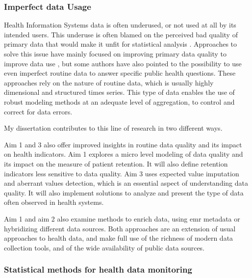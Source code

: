 \subsubsection{Imperfect data Usage}


Health Information Systems data is often underused, or not used at all by its intended users\citep{health_metrics_network_framework_2008}. This underuse is often blamed on the  perceived bad quality of primary data that would make it unfit for statistical analysis
\citep{ronveaux_immunization_2005,makombe_assessing_2008,heunis_accuracy_2011,gimbel_assessment_2011,who_assessment_2011,hahn_where_2013,kihuba_assessing_2014,glele_ahanhanzo_data_2015}. Approaches to solve this issue have mainly focused on improving primary data quality to improve data use  \citep{braa_improving_2012,mutale_improving_2013,ledikwe_improving_2014,nisingizwe_toward_2014}, but some authors have also pointed to the possibility to use even imperfect routine data to answer specific public health questions\citep{gething_improving_2006,gething_information_2007,wagenaar_using_2016}. These approaches rely on the nature of routine data, which is usually highly dimensional and structured times series. This type of data enables the use of robust modeling methods at an adequate level of aggregation, to control and correct for data errors.

My dissertation contributes to this line of research in two different ways.

Aim 1 and 3 also offer improved insights in routine data quality and its impact on health indicators. Aim 1  explores a micro level modeling of data quality and its impact on the measure of patient retention. It will also define retention indicators less sensitive to data quality. Aim 3 uses expected value imputation and aberrant values detection, which is an essential aspect of understanding data quality. It will also implement solutions  to analyze and present the type of data often observed in health systems.

Aim 1 and aim 2 also examine methods to enrich data, using \gls{emr} metadata or  hybridizing different data sources. Both approaches are an extension of usual approaches to health data, and make full use of the richness of modern data collection tools, and of the wide availability of public data sources.

\subsubsection{Statistical methods for health data monitoring}

